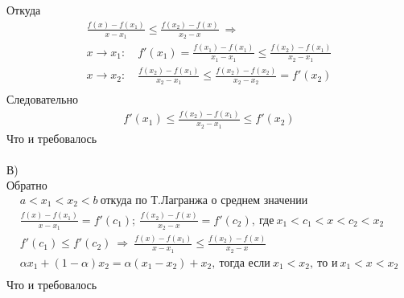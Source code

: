 		Откуда
		\begin{gather*}	
			\frac{f(x) - f(x_1)}{x - x_1} \leqslant \frac{f(x_2) - f(x)}{x_2 - x} \ \Rightarrow \\
			x \to x_1: \quad f'(x_1) = \frac{f(x_1) - f(x_1)}{x_1 - x_1} \leqslant \frac{f(x_2) - f(x_1)}{x_2 - x_1}\\
			x \to x_2: \quad \frac{f(x_2) - f(x_1)}{x_2 - x_1} \leqslant \frac{f(x_2) - f(x_2)}{x_2 - x_2} = f'(x_2)\\
		\end{gather*}
		Следовательно
		\begin{gather*}
			f'(x_1) \leqslant \frac{f(x_2) - f(x_1)}{x_2 - x_1} \leqslant f'(x_2)
		\end{gather*}
		Что и требовалось\\
		\\
		В)\\
		Обратно
		\begin{gather*}
			a < x_1 < x_2 < b \ \text{откуда по Т.Лагранжа о среднем значении} \\ \frac{f(x) - f(x_1)}{x - x_1} = f'(c_1);\ \frac{f(x_2) - f(x)}{x_2 - x} = f'(c_2),\ \text{где}\ x_1<c_1<x<c_2<x_2\\
			f'(c_1) \leqslant f'(c_2) \ \Rightarrow \ \frac{f(x) - f(x_1)}{x - x_1} \leqslant \frac{f(x_2) - f(x)}{x_2 - x}\\
			\alpha x_1 + (1 - \alpha) x_2 = \alpha (x_1 - x_2) + x_2,\ \text{тогда если}\ x_1 < x_2,\ \text{то и}\ x_1<x<x_2\\
		\end{gather*}
		Что и требовалось
		\\
		
